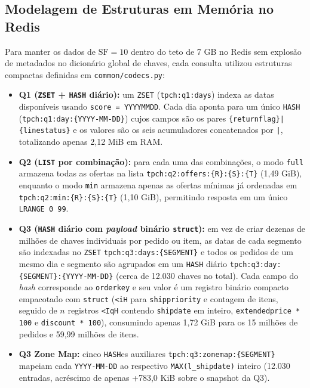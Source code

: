 \documentclass[12pt,a4paper]{article}
\begin{document}
\subsection{Modelagem de Estruturas em Memória no Redis}
Para manter os dados de $\text{SF}=10$ dentro do teto de 7 GB no Redis sem explosão de metadados no dicionário global de chaves, cada consulta utilizou estruturas compactas definidas em \texttt{common/codecs.py}:

\begin{itemize}
    \item \textbf{Q1 (\texttt{ZSET} + \texttt{HASH} diário):} um \texttt{ZSET} (\texttt{tpch:q1:days}) indexa as datas disponíveis usando \texttt{score = YYYYMMDD}. Cada dia aponta para um único \texttt{HASH} (\texttt{tpch:q1:day:\{YYYY-MM-DD\}}) cujos campos são os pares \texttt{\{returnflag\}|\{linestatus\}} e os valores são os seis acumuladores concatenados por \texttt{|}, totalizando apenas 2,12 MiB em RAM.
    \item \textbf{Q2 (\texttt{LIST} por combinação):} para cada uma das combinações, o modo \texttt{full} armazena todas as ofertas na lista \texttt{tpch:q2:offers:\{R\}:\{S\}:\{T\}} (1,49 GiB), enquanto o modo \texttt{min} armazena apenas as ofertas mínimas já ordenadas em \texttt{tpch:q2:min:\{R\}:\{S\}:\{T\}} (1,10 GiB), permitindo resposta em um único \texttt{LRANGE 0 99}.
    \item \textbf{Q3 (\texttt{HASH} diário com \textit{payload} binário \texttt{struct}):} em vez de criar dezenas de milhões de chaves individuais por pedido ou item, as datas de cada segmento são indexadas no \texttt{ZSET} \texttt{tpch:q3:days:\{SEGMENT\}} e todos os pedidos de um mesmo dia e segmento são agrupados em um \texttt{HASH} diário \texttt{tpch:q3:day:\{SEGMENT\}:\{YYYY-MM-DD\}} (cerca de 12.030 chaves no total). Cada campo do \textit{hash} corresponde ao \texttt{orderkey} e seu valor é um registro binário compacto empacotado com \texttt{struct} (\texttt{<iH} para \texttt{shippriority} e contagem de itens, seguido de $n$ registros \texttt{<IqH} contendo \texttt{shipdate} em inteiro, \texttt{extendedprice * 100} e \texttt{discount * 100}), consumindo apenas 1,72 GiB para os 15 milhões de pedidos e 59,99 milhões de itens.
    \item \textbf{Q3 Zone Map:} cinco \texttt{HASH}es auxiliares \texttt{tpch:q3:zonemap:\{SEGMENT\}} mapeiam cada \texttt{YYYY-MM-DD} ao respectivo \texttt{MAX(l\_shipdate)} inteiro (12.030 entradas, acréscimo de apenas +783,0 KiB sobre o snapshot da Q3).
\end{itemize}
\end{document}
